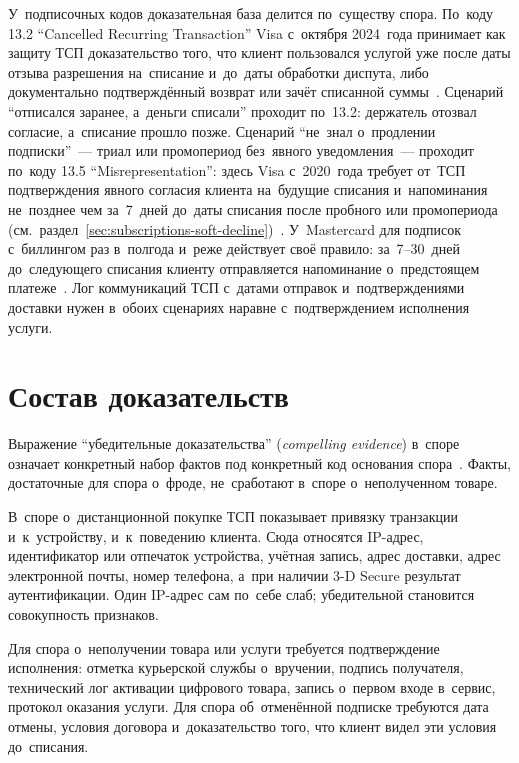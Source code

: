 У~подписочных кодов доказательная база делится по~существу спора. По~коду 13.2
\enquote{Cancelled Recurring Transaction} Visa с~октября 2024~года принимает
как защиту ТСП доказательство того, что клиент пользовался услугой уже после
даты отзыва разрешения на~списание и~до~даты обработки диспута, либо
документально подтверждённый возврат или зачёт списанной
суммы~\cite{visa-core-rules}. Сценарий \enquote{отписался заранее, а~деньги
списали} проходит по~13.2: держатель отозвал согласие, а~списание прошло
позже. Сценарий \enquote{не~знал о~продлении подписки}~--- триал или
промопериод без~явного уведомления~--- проходит по~коду
13.5 \enquote{Misrepresentation}: здесь Visa с~2020~года требует от~ТСП
подтверждения явного согласия клиента на~будущие списания и~напоминания
не~позднее чем за~7~дней до~даты списания после пробного или промопериода
(см.~раздел~\ref{sec:subscriptions-soft-decline})~\cite{visa-core-rules,visa-scf}.
У~Mastercard для подписок с~биллингом раз в~полгода и~реже действует
своё правило: за~7--30~дней до~следующего списания клиенту отправляется
напоминание о~предстоящем платеже~\cite{mc-tpr}. Лог коммуникаций ТСП с~датами
отправок и~подтверждениями доставки нужен в~обоих сценариях наравне
с~подтверждением исполнения услуги.

\section{Состав доказательств}\label{sec:disputes-evidence}

Выражение \enquote{убедительные доказательства} (\textit{compelling evidence})
в~споре означает конкретный набор фактов под конкретный код основания
спора~\cite{visa-core-rules}. Факты, достаточные для спора о~фроде,
не~сработают в~споре о~неполученном товаре.

В~споре о~дистанционной покупке ТСП показывает привязку транзакции
и~к~устройству, и~к~поведению клиента. Сюда относятся IP-адрес, идентификатор
или отпечаток устройства, учётная запись, адрес доставки, адрес электронной
почты, номер телефона, а~при наличии 3-D Secure результат аутентификации. Один
IP-адрес сам по~себе слаб; убедительной становится совокупность признаков.

Для спора о~неполучении товара или услуги требуется подтверждение исполнения:
отметка курьерской службы о~вручении, подпись получателя, технический лог
активации цифрового товара, запись о~первом входе в~сервис, протокол оказания
услуги. Для спора об~отменённой подписке требуются дата отмены, условия договора
и~доказательство того, что клиент видел эти условия до~списания.

